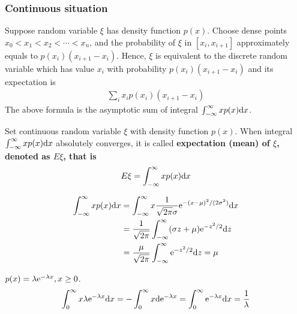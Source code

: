\subsubsection{Continuous situation}

Suppose random variable $\xi$ has density function $p(x)$. Choose dense points $x_0<x_1<x_2<\cdots<x_n$, and the probability of $\xi$ in $[x_i,x_{i+1}]$ approximately equals to $p(x_i)(x_{i+1}-x_i)$. Hence, $\xi$ is equivalent to the discrete random variable which has value $x_i$ with probability $p(x_i)(x_{i+1}-x_i)$ and its expectation is
\begin{align*}
    \sum_i x_i p(x_i)(x_{i+1}-x_i)
\end{align*}
The above formula is the asymptotic sum of integral $\int_{-\infty}^\infty xp(x) {\rm d} x$.

\begin{defn}
    Set continuous random variable $\xi$ with density function $p(x)$. When integral $\int_{-\infty}^\infty xp(x) {\rm d} x$ absolutely converges, it is called \bf{expectation} (\bf{mean}) of $\xi$, denoted as $E\xi$, that is
    \begin{align}
        E\xi = \int_{-\infty}^\infty xp(x) {\rm d} x
    \end{align}
\end{defn}

\begin{exa}
    \begin{align}
        \int_{-\infty}^\infty xp(x) {\rm d} x &= \int_{-\infty}^\infty x \frac{1}{\sqrt{2\pi}\sigma} {\rm e}^{-(x-\mu)^2/(2\sigma^2)} {\rm d} x \nonumber \\
        &= \frac{1}{\sqrt{2\pi}} \int_{-\infty}^\infty (\sigma z +\mu) {\rm e}^{-z^2/2} {\rm d}z\nonumber\\
        &= \frac{\mu}{\sqrt{2\pi}} \int_{-\infty}^\infty {\rm e}^{-z^2/2} {\rm d}z =\mu
    \end{align}
\end{exa}

\begin{exa}
$p(x)=\lambda {\rm e}^{-\lambda x}, x\geq 0$.
\begin{align}
    \int_{0}^\infty x \lambda {\rm e}^{-\lambda x} {\rm d} x = -\int_{0}^\infty x {\rm d} {\rm e}^{-\lambda x} = \int_{0}^\infty {\rm e}^{-\lambda x} {\rm d} x = \frac{1}{\lambda}
\end{align}
\end{exa}

